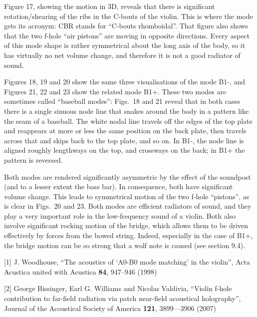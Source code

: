   Figure 17, showing the motion in 3D, reveals that there is significant 
  rotation/shearing of the ribs in the C-bouts of the violin. This is where the 
  mode gets its acronym: CBR stands for “C-bouts rhomboidal”. That figure also 
  shows that the two f-hole “air pistons” are moving in opposite directions. 
  Every aspect of this mode shape is rather symmetrical about the long axis of 
  the body, so it has virtually no net volume change, and therefore it is not a 
  good radiator of sound. 

  Figures 18, 19 and 20 show the same three visualisations of the mode B1-, and 
  Figures 21, 22 and 23 show the related mode B1+. These two modes are 
  sometimes called “baseball modes”: Figs.\ 18 and 21 reveal that in both cases 
  there is a single sinuous node line that snakes around the body in a pattern 
  like the seam of a baseball. The white nodal line travels off the edges of 
  the top plate and reappears at more or less the same position on the back 
  plate, then travels across that and skips back to the top plate, and so on. 
  In B1-, the node line is aligned roughly lengthways on the top, and crossways 
  on the back; in B1+ the pattern is reversed. 

  Both modes are rendered significantly asymmetric by the effect of the 
  soundpost (and to a lesser extent the bass bar). In consequence, both have 
  significant volume change. This leads to symmetrical motion of the two f-hole 
  “pistons”, as is clear in Figs.\ 20 and 23. Both modes are efficient 
  radiators of sound, and they play a very important role in the low-frequency 
  sound of a violin. Both also involve significant rocking motion of the 
  bridge, which allows them to be driven effectively by forces from the bowed 
  string. Indeed, especially in the case of B1+, the bridge motion can be so 
  strong that a wolf note is caused (see section 9.4). 



  \sectionreferences{}[1] J. Woodhouse, “The acoustics of ‘A0-B0 mode matching’ 
  in the violin”, Acta Acustica united with Acustica \textbf{84}, 947–946 
  (1998) 

  [2] George Bissinger, Earl G. Williams and Nicolas Valdivia, “Violin f-hole 
  contribution to far-field radiation via patch near-field acoustical 
  holography”, Journal of the Acoustical Society of America \textbf{121}, 
  3899—3906 (2007) 